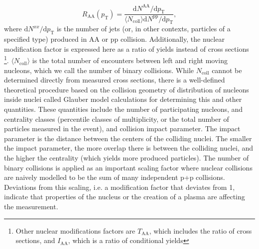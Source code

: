   \begin{equation}
    R_\mathrm{AA}(p_\mathrm{T}) = \frac{\mathrm{d}N^\mathrm{AA}/\mathrm{d}p_\mathrm{T}}{\langle N_\mathrm{coll}\rangle\mathrm{d}N^\mathrm{pp}/\mathrm{d}p_\mathrm{T}},
    \label{eq:raa}
  \end{equation}
where $\mathrm{d}N^{xx}/\mathrm{d}p_\mathrm{T}$ is the number of jets (or, in other contexts, particles of a specified type) produced in AA or pp collision. Additionally, the nuclear modification factor is expressed here as a ratio of yields instead of cross sections \footnote{Other nuclear modifications factors are $T_\mathrm{AA}$, which includes the ratio of cross sections, and $I_\mathrm{AA}$, which is a ratio of conditional yields}. $\langle N_\mathrm{coll}\rangle$ is the total number of encounters between left and right moving nucleons, which we call the number of binary collisions. While $N_\mathrm{coll}$ cannot be determined directly from measured cross sections, there is a well-defined theoretical procedure based on the collision geometry of distribution of nucleons inside nuclei called Glauber model calculations \cite{doi:10.1146/annurev.nucl.57.090506.123020} for determining this and other quantities. These quantities include the  number of participating nucleons, and centrality classes (percentile classes of multiplicity, or the total number of particles measured in the event), and collision impact parameter. The impact parameter is the distance between the centers of the colliding nuclei. The smaller the impact parameter, the more overlap there is between the colliding nuclei, and the higher the centrality (which yields more produced particles). The number of binary collisions is applied as an important scaling factor where nuclear collisions are naively modelled to be the sum of many independent p+p collisions. Deviations from this scaling, i.e. a modification factor that deviates from 1, indicate that properties of the nucleus or the creation of a plasma are affecting the measurement.

